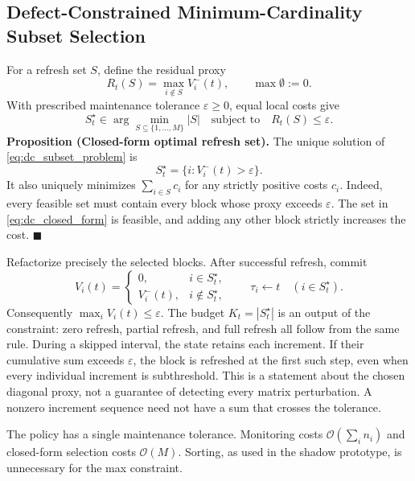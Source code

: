 \documentclass[preprint,12pt,3p]{elsarticle}
\begin{document}
\subsection{Defect-Constrained Minimum-Cardinality Subset Selection}
For a refresh set $S$, define the residual proxy
\begin{equation}
R_t(S)=\max_{i\notin S}V_i^-(t),\qquad \max\emptyset:=0.
\label{eq:dc_residual_proxy}
\end{equation}
With prescribed maintenance tolerance $\varepsilon\ge0$, equal local costs give
\begin{equation}
S_t^\star\in\arg\min_{S\subseteq\{1,\ldots,M\}}|S|
\quad\text{subject to}\quad R_t(S)\le\varepsilon.
\label{eq:dc_subset_problem}
\end{equation}
\noindent\textbf{Proposition (Closed-form optimal refresh set).}
The unique solution of \eqref{eq:dc_subset_problem} is
\begin{equation}
\boxed{S_t^\star=\{i:V_i^-(t)>\varepsilon\}.}
\label{eq:dc_closed_form}
\end{equation}
It also uniquely minimizes $\sum_{i\in S}c_i$ for any strictly positive costs
$c_i$. Indeed, every feasible set must contain every block whose proxy exceeds
$\varepsilon$. The set in \eqref{eq:dc_closed_form} is feasible, and adding any
other block strictly increases the cost. \hfill $\blacksquare$

Refactorize precisely the selected blocks. After successful refresh, commit
\begin{equation}
V_i(t)=\begin{cases}0,&i\in S_t^\star,\\
V_i^-(t),&i\notin S_t^\star,\end{cases}
\qquad
\tau_i\leftarrow t\quad(i\in S_t^\star).
\label{eq:dc_state_commit}
\end{equation}
Consequently $\max_i V_i(t)\le\varepsilon$.
The budget $K_t=|S_t^\star|$ is an output of the constraint: zero refresh,
partial refresh, and full refresh all follow from the same rule.
During a skipped interval, the state retains each increment. If their
cumulative sum exceeds $\varepsilon$, the block is refreshed at the first
such step, even when every individual increment is subthreshold. This is a
statement about the chosen diagonal proxy, not a guarantee of detecting every
matrix perturbation. A nonzero increment sequence need not have a sum that
crosses the tolerance.

The policy has a single maintenance tolerance. Monitoring costs
$\mathcal O(\sum_i n_i)$ and closed-form selection costs $\mathcal O(M)$.
Sorting, as used in the shadow prototype, is unnecessary for the max constraint.
\end{document}
